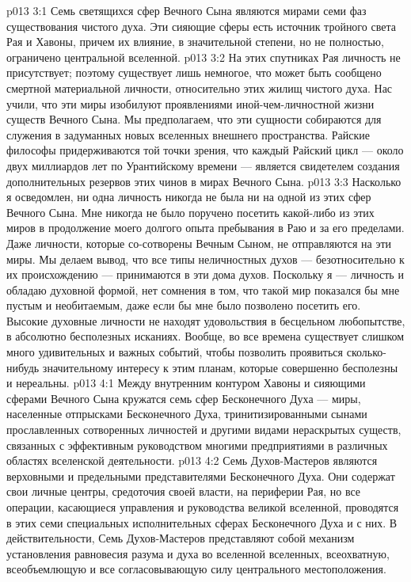 \vs p013 3:1 Семь светящихся сфер Вечного Сына являются мирами семи фаз существования чистого духа. Эти сияющие сферы есть источник тройного света Рая и Хавоны, причем их влияние, в значительной степени, но не полностью, ограничено центральной вселенной.
\vs p013 3:2 На этих спутниках Рая личность не присутствует; поэтому существует лишь немногое, что может быть сообщено смертной материальной личности, относительно этих жилищ чистого духа. Нас учили, что эти миры изобилуют проявлениями иной\hyp{}чем\hyp{}личностной жизни существ Вечного Сына. Мы предполагаем, что эти сущности собираются для служения в задуманных новых вселенных внешнего пространства. Райские философы придерживаются той точки зрения, что каждый Райский цикл --- около двух миллиардов лет по Урантийскому времени --- является свидетелем создания дополнительных резервов этих чинов в мирах Вечного Сына.
\vs p013 3:3 \pc Насколько я осведомлен, ни одна личность никогда не была ни на одной из этих сфер Вечного Сына. Мне никогда не было поручено посетить какой\hyp{}либо из этих миров в продолжение моего долгого опыта пребывания в Раю и за его пределами. Даже личности, которые со\hyp{}сотворены Вечным Сыном, не отправляются на эти миры. Мы делаем вывод, что все типы неличностных духов --- безотносительно к их происхождению --- принимаются в эти дома духов. Поскольку я --- личность и обладаю духовной формой, нет сомнения в том, что такой мир показался бы мне пустым и необитаемым, даже если бы мне было позволено посетить его. Высокие духовные личности не находят удовольствия в бесцельном любопытстве, в абсолютно бесполезных исканиях. Вообще, во все времена существует слишком много удивительных и важных событий, чтобы позволить проявиться сколько\hyp{}нибудь значительному интересу к этим планам, которые совершенно бесполезны и нереальны.
\vs p013 4:1 Между внутренним контуром Хавоны и сияющими сферами Вечного Сына кружатся семь сфер Бесконечного Духа --- миры, населенные отпрысками Бесконечного Духа, тринитизированными сынами прославленных сотворенных личностей и другими видами нераскрытых существ, связанных с эффективным руководством многими предприятиями в различных областях вселенской деятельности.
\vs p013 4:2 Семь Духов\hyp{}Мастеров являются верховными и предельными представителями Бесконечного Духа. Они содержат свои личные центры, средоточия своей власти, на периферии Рая, но все операции, касающиеся управления и руководства великой вселенной, проводятся в этих семи специальных исполнительных сферах Бесконечного Духа и с них. В действительности, Семь Духов\hyp{}Мастеров представляют собой механизм установления равновесия разума и духа во вселенной вселенных, всеохватную, всеобъемлющую и все согласовывающую силу центрального местоположения.
